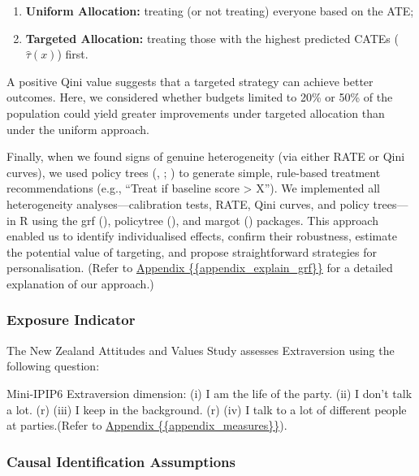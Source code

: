 \documentclass[
  single column]{article}
\providecommand{\tightlist}{%
  \setlength{\itemsep}{0pt}\setlength{\parskip}{0pt}}
\begin{document}
\begin{enumerate}
\def\labelenumi{\arabic{enumi}.}
\tightlist
\item
  \textbf{Uniform Allocation:} treating (or not treating) everyone based
  on the ATE;
\item
  \textbf{Targeted Allocation:} treating those with the highest
  predicted CATEs (\(\hat{\tau}(x)\)) first.
\end{enumerate}

A positive Qini value suggests that a targeted strategy can achieve
better outcomes. Here, we considered whether budgets limited to 20\% or
50\% of the population could yield greater improvements under targeted
allocation than under the uniform approach.

Finally, when we found signs of genuine heterogeneity (via either RATE
or Qini curves), we used policy trees (,
;
) to
generate simple, rule-based treatment recommendations (e.g., ``Treat if
baseline score \textgreater{} X''). We implemented all heterogeneity
analyses---calibration tests, RATE, Qini curves, and policy trees---in R
using the grf (),
policytree (), and margot ()
packages. This approach enabled us to identify individualised effects,
confirm their robustness, estimate the potential value of targeting, and
propose straightforward strategies for personalisation. (Refer to
\hyperref[appendix-explain-grf]{Appendix \{\{appendix\_explain\_grf\}\}}
for a detailed explanation of our approach.)

\subsubsection{Exposure Indicator}\label{exposure-indicator}

The New Zealand Attitudes and Values Study assesses Extraversion using
the following question:

Mini-IPIP6 Extraversion dimension: (i) I am the life of the party. (ii)
I don't talk a lot. (r) (iii) I keep in the background. (r) (iv) I talk
to a lot of different people at parties.(Refer to
\hyperref[appendix-measures]{Appendix \{\{appendix\_measures\}\}}).

\subsubsection{Causal Identification
Assumptions}\label{causal-identification-assumptions}
\end{document}
